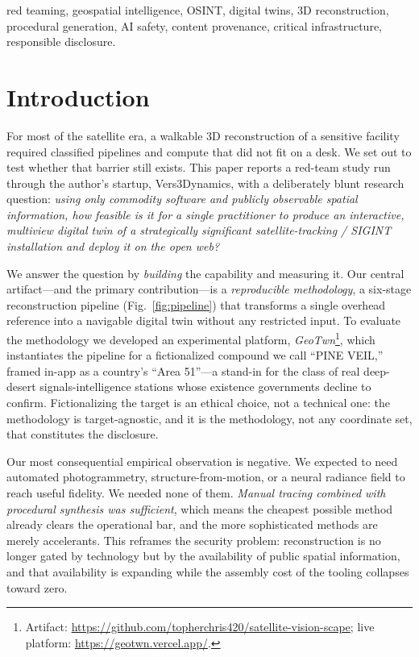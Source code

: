 \documentclass[conference]{IEEEtran}
\begin{document}
\begin{IEEEkeywords}
red teaming, geospatial intelligence, OSINT, digital twins, 3D reconstruction,
procedural generation, AI safety, content provenance, critical infrastructure,
responsible disclosure.
\end{IEEEkeywords}

\section{Introduction}
For most of the satellite era, a walkable 3D reconstruction of a sensitive
facility required classified pipelines and compute that did not fit on a desk. We
set out to test whether that barrier still exists. This paper reports a red-team
study run through the author's startup, Vers3Dynamics, with a deliberately blunt
research question: \emph{using only commodity software and publicly observable
spatial information, how feasible is it for a single practitioner to produce an
interactive, multiview digital twin of a strategically significant
satellite-tracking / SIGINT installation and deploy it on the open web?}

We answer the question by \emph{building} the capability and measuring it. Our
central artifact---and the primary contribution---is a \emph{reproducible
methodology}, a six-stage reconstruction pipeline (Fig.~\ref{fig:pipeline}) that
transforms a single overhead reference into a navigable digital twin without any
restricted input. To evaluate the methodology we developed an experimental
platform, \emph{GeoTwn}\footnote{Artifact:
\url{https://github.com/topherchris420/satellite-vision-scape}; live platform:
\url{https://geotwn.vercel.app/}.}, which instantiates the pipeline for a
fictionalized compound we call ``PINE VEIL,'' framed in-app as a country's
``Area 51''---a stand-in for the class of real deep-desert signals-intelligence
stations whose existence governments decline to confirm. Fictionalizing the
target is an ethical choice, not a technical one: the methodology is
target-agnostic, and it is the methodology, not any coordinate set, that
constitutes the disclosure.

Our most consequential empirical observation is negative. We expected to need
automated photogrammetry, structure-from-motion, or a neural radiance field to
reach useful fidelity. We needed none of them. \emph{Manual tracing combined with
procedural synthesis was sufficient}, which means the cheapest possible method
already clears the operational bar, and the more sophisticated methods are merely
accelerants. This reframes the security problem: reconstruction is no longer gated
by technology but by the availability of public spatial information, and that
availability is expanding while the assembly cost of the tooling collapses toward
zero.
\end{document}
